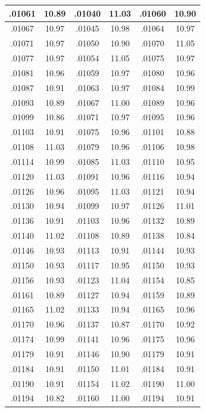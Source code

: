 \documentclass[10pt,twoside]{report}
\begin{document}
\begin{appendices}
\begin{longtable}{|c|c||c|c||c|c|}
.01061 & 10.89 & .01040 & 11.03 & .01060 & 10.90\\\hline
.01067 & 10.97 & .01045 & 10.98 & .01064 & 10.97\\\hline
.01071 & 10.97 & .01050 & 10.90 & .01070 & 11.05\\\hline
.01077 & 10.97 & .01054 & 11.05 & .01075 & 10.97\\\hline
.01081 & 10.96 & .01059 & 10.97 & .01080 & 10.96\\\hline
.01087 & 10.91 & .01063 & 10.97 & .01084 & 10.99\\\hline
.01093 & 10.89 & .01067 & 11.00 & .01089 & 10.96\\\hline
.01099 & 10.86 & .01071 & 10.97 & .01095 & 10.96\\\hline
.01103 & 10.91 & .01075 & 10.96 & .01101 & 10.88\\\hline
.01108 & 11.03 & .01079 & 10.96 & .01106 & 10.98\\\hline
.01114 & 10.99 & .01085 & 11.03 & .01110 & 10.95\\\hline
.01120 & 11.03 & .01091 & 10.96 & .01116 & 10.94\\\hline
.01126 & 10.96 & .01095 & 11.03 & .01121 & 10.94\\\hline
.01130 & 10.94 & .01099 & 10.97 & .01126 & 11.01\\\hline
.01136 & 10.91 & .01103 & 10.96 & .01132 & 10.89\\\hline
.01140 & 11.02 & .01108 & 10.89 & .01138 & 10.84\\\hline
.01146 & 10.93 & .01113 & 10.91 & .01144 & 10.93\\\hline
.01150 & 10.93 & .01117 & 10.95 & .01150 & 10.93\\\hline
.01156 & 10.93 & .01123 & 11.04 & .01154 & 10.85\\\hline
.01161 & 10.89 & .01127 & 10.94 & .01159 & 10.89\\\hline
.01165 & 11.02 & .01133 & 10.94 & .01165 & 10.96\\\hline
.01170 & 10.96 & .01137 & 10.87 & .01170 & 10.92\\\hline
.01174 & 10.99 & .01141 & 10.96 & .01175 & 10.96\\\hline
.01179 & 10.91 & .01146 & 10.90 & .01179 & 10.91\\\hline
.01184 & 10.91 & .01150 & 11.01 & .01184 & 10.91\\\hline
.01190 & 10.91 & .01154 & 11.02 & .01190 & 11.00\\\hline
.01194 & 10.82 & .01160 & 11.00 & .01194 & 10.91\\\hline

\end{longtable}
\end{appendices}
\end{document}
